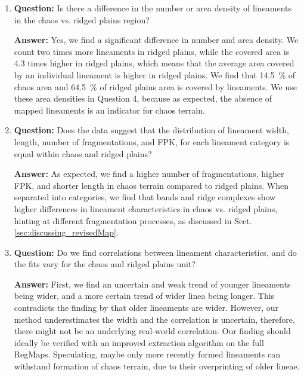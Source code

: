 \begin{enumerate}
    \item \textbf{Question:} Is there a difference in the number or area density of lineaments in the chaos vs. ridged plains region?
    
     \textbf{Answer:} Yes, we find a significant difference in number and area density. We count two times more lineaments in ridged plains, while the covered area is 4.3 times higher in ridged plains, which means that the average area covered by an individual lineament is higher in ridged plains. We find that 14.5~\% of chaos area and 64.5~\% of ridged plains area is covered by lineaments. We use these area densities in Question 4, because as expected, the absence of mapped lineaments is an indicator for chaos terrain. 
    
    \item \textbf{Question:} Does the data suggest that the distribution of lineament width, length, number of fragmentations, and FPK, for each lineament category is equal within chaos and ridged plains?

    \textbf{Answer:} As expected, we find a higher number of fragmentations, higher FPK, and shorter length in chaos terrain compared to ridged plains. When separated into categories, we find that bands and ridge complexes show higher differences in lineament characteristics in chaos vs. ridged plains, hinting at different fragmentation processes, as discussed in Sect. \ref{sec:discussing_revisedMap}.

    \item \textbf{Question:} Do we find correlations between lineament characteristics, and do the fits vary for the chaos and ridged plains unit?

    \textbf{Answer:} First, we find an uncertain and weak trend of younger lineaments being wider, and a more certain trend of wider linea being longer. This contradicts the finding by  that older lineaments are wider. However, our method underestimates the width and the correlation is uncertain, therefore, there might not be an underlying real-world correlation. Our finding should ideally be verified with an improved extraction algorithm on the full RegMaps. Speculating, maybe only more recently formed lineaments can withstand formation of chaos terrain, due to their overprinting of older lineae.


\end{enumerate}

